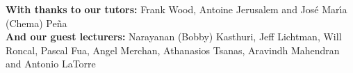 \documentclass[a4paper, 11pt]{article}
\numberwithin{equation}{section}
\begin{document}
\newpage
\pagestyle{plain}
\clearpage
\vspace*{\fill}
\centering
\begin{center}
	\begin{minipage}{.8\textwidth}
		
\textbf{With thanks to our tutors:}\newline
Frank Wood, Antoine Jerusalem and Jos\'{e} Mar\'{\i}a (Chema) Pe\~{n}a\newline
\\
\textbf{And our guest lecturers:}\newline
Narayanan (Bobby) Kasthuri, Jeff Lichtman, Will Roncal, Pascal Fua, Angel Merchan, Athanasios Tsanas, Aravindh Mahendran and Antonio LaTorre
	\end{minipage}
\end{center}
\vfill %
\clearpage

\newpage
	\pagestyle{plain}
	
	

	
\end{document}

